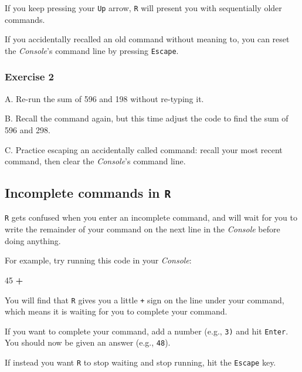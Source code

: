 \documentclass[
]{book}
\newenvironment{Shaded}{\begin{snugshade}}{\end{snugshade}}
\newcommand{\DecValTok}[1]{\textcolor[rgb]{0.00,0.00,0.81}{#1}}
\newcommand{\OperatorTok}[1]{\textcolor[rgb]{0.81,0.36,0.00}{\textbf{#1}}}
\begin{document}
If you keep pressing your \texttt{Up} arrow, \texttt{R} will present you with sequentially older commands.

If you accidentally recalled an old command without meaning to, you can reset the \emph{Console}'s command line by pressing \texttt{Escape}.

\hypertarget{exercise-2}{%
\subsubsection*{Exercise 2}\label{exercise-2}}

A. Re-run the sum of 596 and 198 without re-typing it.

B. Recall the command again, but this time adjust the code to find the sum of 596 and 298.

C. Practice escaping an accidentally called command: recall your most recent command, then clear the \emph{Console}'s command line.

\hypertarget{incomplete-commands-in-r}{%
\subsection*{\texorpdfstring{Incomplete commands in \texttt{R}}{Incomplete commands in R}}\label{incomplete-commands-in-r}}

\texttt{R} gets confused when you enter an incomplete command, and will wait for you to write the remainder of your command on the next line in the \emph{Console} before doing anything.

For example, try running this code in your \emph{Console}:

\begin{Shaded}
\begin{Highlighting}[]
\DecValTok{45} \OperatorTok{+}
\end{Highlighting}
\end{Shaded}

You will find that \texttt{R} gives you a little \texttt{+} sign on the line under your command, which means it is waiting for you to complete your command.

If you want to complete your command, add a number (e.g., \texttt{3)} and hit \texttt{Enter}. You should now be given an answer (e.g., \texttt{48}).

If instead you want \texttt{R} to stop waiting and stop running, hit the \texttt{Escape} key.
\end{document}
